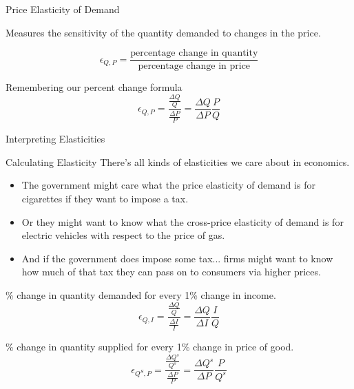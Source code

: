 \documentclass[12pt,t]{beamer}
\begin{document}
\begin{frame}{Price Elasticity of Demand}
  
  Measures the sensitivity of the quantity demanded to changes in the price.

  $$
    \epsilon_{Q,P} = \frac{\text{percentage change in quantity}}{\text{percentage change in price}}
  $$

  \pause\bigskip
  Remembering our percent change formula
  $$
    \epsilon_{Q,P} = \frac{\frac{\Delta Q}{Q}}{\frac{\Delta P}{P} } = \frac{\Delta Q}{\Delta P} \frac{P}{Q}
  $$
\end{frame}

\begin{frame}{Interpreting Elasticities}
  \bigskip

\end{frame}

\begin{frame}{Calculating Elasticity}
  There's all kinds of elasticities we care about in economics. 

  \begin{itemize}
    \item The government might care what the price elasticity of demand is for cigarettes if they want to impose a tax.

    \item Or they might want to know what the cross-price elasticity of demand is for electric vehicles with respect to the price of gas.

    \item And if the government does impose some tax... firms might want to know how much of that tax they can pass on to consumers via higher prices.
  \end{itemize}
\end{frame}

\begin{frame}
  
  \bigskip
  \% change in quantity demanded for every 1\% change in income.
  $$
    \epsilon_{Q,I} = \frac{\frac{\Delta Q}{Q}}{\frac{\Delta I}{I}} = \frac{\Delta Q}{\Delta I}\frac{I}{Q}
  $$

  \bigskip
  
  \bigskip
  \% change in quantity supplied for every 1\% change in price of good.
  $$
    \epsilon_{Q^S,P} = \frac{\frac{\Delta Q^s}{Q^s}}{\frac{\Delta P}{P}} = \frac{\Delta Q^s}{\Delta P}\frac{P}{Q^s}
  $$
\end{frame}
\end{document}
